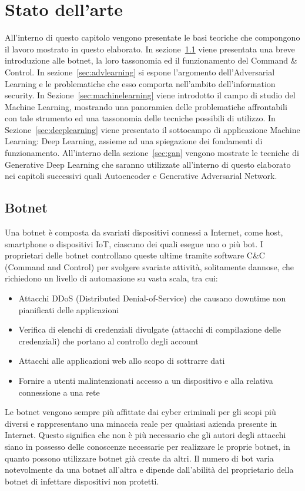 \chapter{Stato dell'arte}
\label{statodellarte}
All'interno di questo capitolo vengono presentate le basi teoriche che compongono il lavoro mostrato in questo elaborato. In sezione~\ref{sec:botnet} viene presentata una breve introduzione alle botnet, la loro tassonomia ed il funzionamento del Command \& Control. In sezione~\ref{sec:advlearning} si espone l'argomento dell'Adversarial Learning e le problematiche che esso comporta nell'ambito dell'information security. In Sezione~\ref{sec:machinelearning} viene introdotto il campo di studio del Machine Learning, mostrando una panoramica delle problematiche affrontabili con tale strumento ed una tassonomia delle tecniche possibili di utilizzo. In Sezione~\ref{sec:deeplearning} viene presentato il sottocampo di applicazione Machine Learning: Deep Learning, assieme ad una spiegazione dei fondamenti di funzionamento.
All'interno della sezione~\ref{sec:gan} vengono mostrate le tecniche di Generative Deep Learning che saranno utilizzate all'interno di questo elaborato nei capitoli successivi quali Autoencoder e Generative Adversarial Network.

\newpage
\section{Botnet}
\label{sec:botnet}
Una botnet è composta da svariati dispositivi connessi a Internet, come host, smartphone o dispositivi IoT, ciascuno dei quali esegue uno o più bot. I proprietari delle botnet controllano queste ultime tramite software C\&C (Command and Control) per svolgere svariate attività, solitamente dannose, che richiedono un livello di automazione su vasta scala, tra cui:
\begin{itemize}
\item Attacchi DDoS (Distributed Denial-of-Service) che causano downtime non pianificati delle applicazioni
\item Verifica di elenchi di credenziali divulgate (attacchi di compilazione delle credenziali) che portano al controllo degli account
\item Attacchi alle applicazioni web allo scopo di sottrarre dati
\item Fornire a utenti malintenzionati accesso a un dispositivo e alla relativa connessione a una rete
\end{itemize}

Le botnet vengono sempre più affittate dai cyber criminali per gli scopi più diversi e rappresentano una minaccia reale per qualsiasi azienda presente in Internet. Questo significa che non è più necessario che gli autori degli attacchi siano in possesso delle conoscenze necessarie per realizzare le proprie botnet, in quanto possono utilizzare botnet già create da altri. Il numero di bot varia notevolmente da una botnet all'altra e dipende dall'abilità del proprietario della botnet di infettare dispositivi non protetti. 

